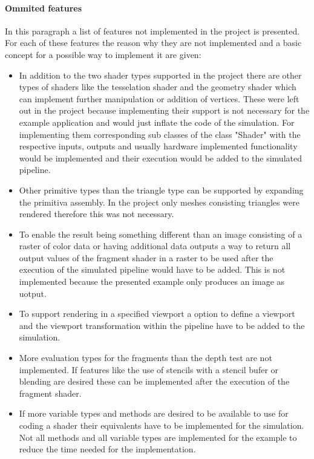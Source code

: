 \paragraph{Ommited features}

In this paragraph a list of features not implemented in the project is presented. For each of these features the reason why they are not implemented and a basic concept for a possible way to implement it are given:

\begin{itemize}
\item In addition to the two shader types supported in the project there are other types of shaders like the tesselation shader and the geometry shader which can implement further manipulation or addition of vertices. These were left out in the project because implementing their support is not necessary for the example application and would just inflate the code of the simulation. For implementing them corresponding sub classes of the class "Shader" with the respective inputs, outputs and usually hardware implemented functionality would be implemented and their execution would be added to the simulated pipeline.
\item Other primitive types than the triangle type can be supported by expanding the primitiva assembly. In the project only meshes consisting triangles were rendered therefore this was not necessary.
\item To enable the result being something different than an image consisting of a raster of color data or having additional data outputs a way to return all output values of the fragment shader in a raster to be used after the execution of the simulated pipeline would have to be added. This is not implemented because the presented example only produces an image as uotput.
\item To support rendering in a specified viewport a option to define a viewport and the viewport transformation within the pipeline have to be added to the simulation.
\item More evaluation types for the fragments than the depth test are not implemented. If features like the use of stencils with a stencil bufer or blending are desired these can be implemented after the execution of the fragment shader.
\item If more variable types and methods are desired to be available to use for coding a shader their equivalents have to be implemented for the simulation. Not all methods and all variable types are implemented for the example to reduce the time needed for the implementation.
\end{itemize}

